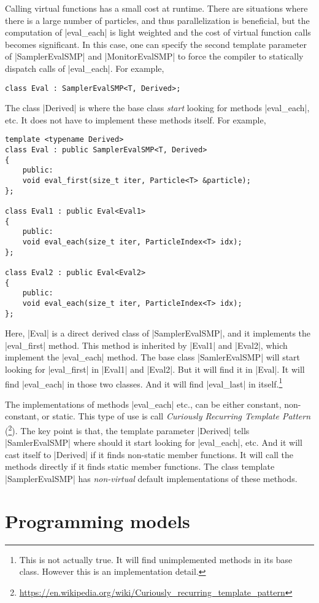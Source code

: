 Calling virtual functions has a small cost at runtime. There are situations
where there is a large number of particles, and thus parallelization is
beneficial, but the computation of |eval_each| is light weighted and the cost
of virtual function calls becomes significant. In this case, one can specify
the second template parameter of |SamplerEvalSMP| and |MonitorEvalSMP| to force
the compiler to statically dispatch calls of |eval_each|. For example,
\begin{Verbatim}
class Eval : SamplerEvalSMP<T, Derived>;
\end{Verbatim}
The class |Derived| is where the base class \emph{start} looking for methods
|eval_each|, etc. It does not have to implement these methods itself. For
example,
\begin{Verbatim}
template <typename Derived>
class Eval : public SamplerEvalSMP<T, Derived>
{
    public:
    void eval_first(size_t iter, Particle<T> &particle);
};

class Eval1 : public Eval<Eval1>
{
    public:
    void eval_each(size_t iter, ParticleIndex<T> idx);
};

class Eval2 : public Eval<Eval2>
{
    public:
    void eval_each(size_t iter, ParticleIndex<T> idx);
};
\end{Verbatim}
Here, |Eval| is a direct derived class of |SamplerEvalSMP|, and it implements
the |eval_first| method. This method is inherited by |Eval1| and |Eval2|, which
implement the |eval_each| method. The base class |SamlerEvalSMP| will start
looking for |eval_first| in |Eval1| and |Eval2|. But it will find it in |Eval|.
It will find |eval_each| in those two classes. And it will find |eval_last| in
itself.\footnote{This is not actually true. It will find unimplemented methods
in its base class. However this is an implementation detail.}

The implementations of methods |eval_each| etc., can be either constant,
non-constant, or static. This type of use is call \emph{Curiously Recurring
Template Pattern} (\crtp\footnote{
\url{https://en.wikipedia.org/wiki/Curiously_recurring_template_pattern}}). The
key point is that, the template parameter |Derived| tells |SamlerEvalSMP| where
should it start looking for |eval_each|, etc. And it will cast itself to
|Derived| if it finds non-static member functions. It will call the methods
directly if it finds static member functions. The class template
|SamplerEvalSMP| has \emph{non-virtual} default implementations of these
methods.

\section{Programming models}
\label{sec:Programming models}


